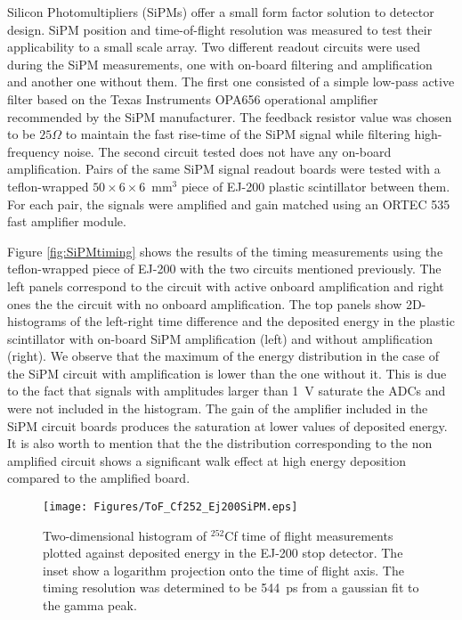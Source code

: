 Silicon Photomultipliers (SiPMs) offer a small form factor solution to detector design. SiPM position and time-of-flight resolution was measured to test their applicability to a small scale array. Two different readout circuits were used during the SiPM measurements, one with on-board filtering and amplification and another one without them.  The first one consisted of a simple low-pass active filter based on the Texas Instruments\textsuperscript{\textregistered} OPA656 operational amplifier recommended by the SiPM manufacturer. The feedback resistor value was chosen to be $25\Omega$ to maintain the fast rise-time of the SiPM signal while filtering high-frequency noise. The second circuit tested does not have any on-board amplification. Pairs of the same SiPM signal readout boards were tested with a teflon-wrapped $50\times6\times6$~mm$^3$ piece of EJ-200 plastic scintillator between them. For each pair, the signals were amplified and gain matched using an ORTEC\textsuperscript{\textregistered} 535 fast amplifier module.

Figure \ref{fig:SiPMtiming} shows the results of the timing measurements using the teflon-wrapped piece of EJ-200 with the two circuits mentioned previously. The left panels correspond to the circuit with active onboard amplification and right ones the the circuit with no onboard amplification. The top panels show 2D-histograms of the left-right time difference and the deposited energy in the plastic scintillator with on-board SiPM amplification (left) and without amplification (right). We observe that the maximum of the energy distribution in the case of the SiPM circuit with amplification is lower than the one without it. This is due to the fact that signals with amplitudes larger than 1~V saturate the ADCs and were not included in the histogram. The gain of the amplifier included in the SiPM circuit boards produces the saturation at lower values of deposited energy. It is also worth to mention that the the distribution corresponding to the non amplified circuit shows a significant walk effect at high energy deposition compared to the amplified board.
\begin{figure}[t]
  \texttt{[image: Figures/ToF\_Cf252\_Ej200SiPM.eps]}
  \caption{Two-dimensional histogram of $^{252}$Cf time of flight measurements plotted against deposited energy in the EJ-200 stop detector. The inset show a logarithm projection onto the time of flight axis. The timing resolution was determined to be 544~ps from a gaussian fit to the gamma peak.}
  \label{fig:ToF_SiPM}
\end{figure}

